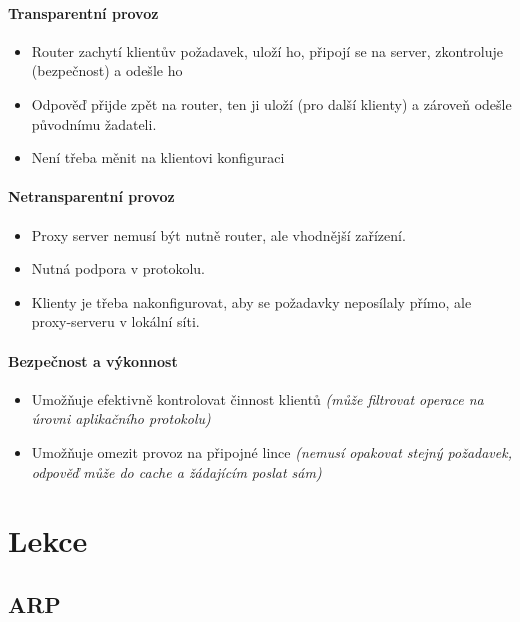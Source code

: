 \documentclass[10pt,a4paper]{article}
\begin{document}
\paragraph*{Transparentní provoz}
\begin{itemize}
    \item Router zachytí klientův požadavek, uloží ho, připojí se na server, zkontroluje (bezpečnost) a odešle ho
    \item Odpověď přijde zpět na router, ten ji uloží (pro další klienty) a zároveň odešle původnímu žadateli.
    \item Není třeba měnit na klientovi konfiguraci
\end{itemize}

\paragraph*{Netransparentní provoz}
\begin{itemize}
    \item Proxy server nemusí být nutně router, ale vhodnější zařízení.
    \item Nutná podpora v protokolu.
    \item Klienty je třeba nakonfigurovat, aby se požadavky neposílaly přímo, ale proxy-serveru v lokální síti.
\end{itemize}

\paragraph*{Bezpečnost a výkonnost}
\begin{itemize}
    \item Umožňuje efektivně kontrolovat činnost klientů \textit{(může filtrovat operace na úrovni aplikačního protokolu)}
    \item Umožňuje omezit provoz na připojné lince \textit{(nemusí opakovat stejný požadavek, odpověď může do cache a žádajícím poslat sám)}
\end{itemize}


\newpage

\section{Lekce}

\subsection{ARP}
\end{document}
